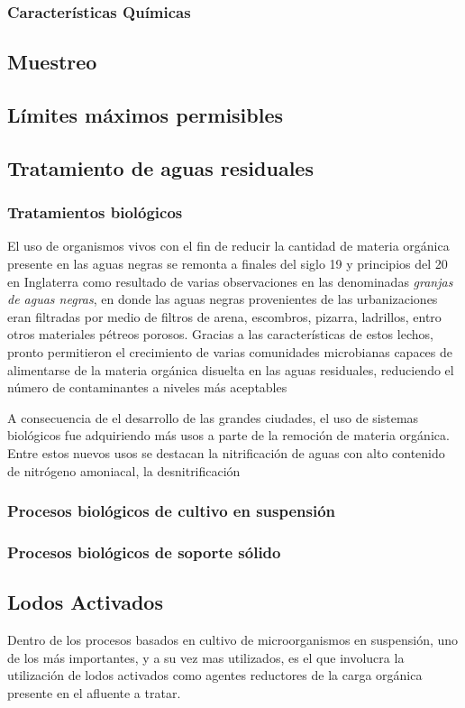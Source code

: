 \subsubsection{Características Químicas}
\subsection{Muestreo}
\subsection{Límites máximos permisibles}\label{NOM2021}
\subsection{Tratamiento de aguas residuales}

\subsubsection{Tratamientos biológicos}
El uso de organismos vivos con el fin de reducir la cantidad de materia orgánica presente en las aguas negras se remonta a finales del siglo 19 y principios del 20 en Inglaterra como resultado de varias observaciones en las denominadas \emph{granjas de aguas negras}, en donde las aguas negras provenientes de las urbanizaciones eran filtradas por medio de filtros de arena, escombros, pizarra, ladrillos, entro otros materiales pétreos porosos. Gracias a las características de estos lechos, pronto permitieron el crecimiento de varias comunidades microbianas capaces de alimentarse de la materia orgánica disuelta en las aguas residuales, reduciendo el número de contaminantes a niveles más aceptables~\citep{Fair2008}\par
A consecuencia de el desarrollo de las grandes ciudades, el uso de sistemas biológicos fue adquiriendo más usos a parte de la remoción de materia orgánica. Entre estos nuevos usos se destacan la nitrificación de aguas con alto contenido de nitrógeno amoniacal, la desnitrificación 
\subsubsection*{Procesos biológicos de cultivo en suspensión}
\subsubsection*{Procesos biológicos de soporte sólido}
\subsection{Lodos Activados}
Dentro de los procesos basados en cultivo de microorganismos en suspensión, uno de los más importantes, y a su vez mas utilizados, es el que involucra la utilización de lodos activados como agentes reductores de la carga orgánica presente en el afluente a tratar.
